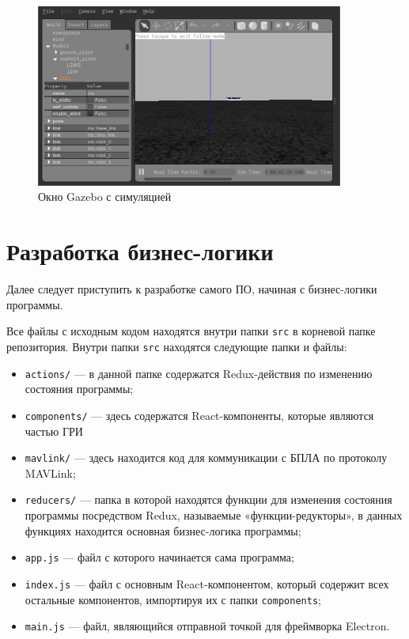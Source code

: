\documentclass[specification,annotation]{itmo-student-thesis}
\begin{document}
\begin{figure}[H]
  \caption{Окно Gazebo с симуляцией}\label{pic:gazebo-px4}
  \centering
  \includegraphics[width=0.9\textwidth]{gazebo-px4}
\end{figure}

\section{Разработка бизнес-логики}\label{sec:devlogic}

Далее следует приступить к разработке самого ПО, начиная с бизнес-логики
программы.

Все файлы с исходным кодом находятся внутри папки \verb|src| в корневой папке
репозитория. Внутри папки \verb|src| находятся следующие папки и файлы:

\begin{itemize}
  \item \verb|actions/| --- в данной папке содержатся Redux-действия по
    изменению состояния программы;
  \item \verb|components/| --- здесь содержатся React-компоненты, которые
    являются частью ГРИ
  \item \verb|mavlink/| --- здесь находится код для коммуникации с БПЛА по
    протоколу MAVLink;
  \item \verb|reducers/| --- папка в которой находятся функции для изменения
    состояния программы посредством Redux, называемые «функции-редукторы», в
    данных функциях находится основная бизнес-логика программы;
  \item \verb|app.js| --- файл с которого начинается сама программа;
  \item \verb|index.js| --- файл с основным React-компонентом, который содержит
    всех остальные компонентов, импортируя их с папки \verb|components|;
  \item \verb|main.js| --- файл, являющийся отправной точкой для фреймворка
    Electron.
\end{itemize}
\end{document}
